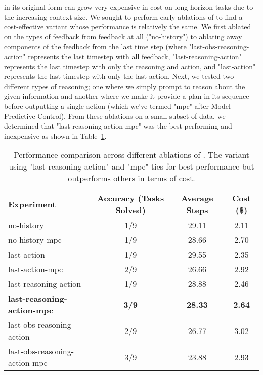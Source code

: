 \react{} in its original form can grow very expensive in cost on long horizon tasks due to the increasing context size. We sought to perform early ablations of \react{} to find a cost-effective variant whose performance is relatively the same. We first ablated on the types of feedback from feedback at all ("no-history") to ablating away components of the feedback from the last time step (where "last-obs-reasoning-action" represents the last timestep with all feedback, "last-reasoning-action" represents the last timestep with only the reasoning and action, and "last-action" represents the last timestep with only the last action. Next, we tested two different types of reasoning; one where we simply prompt \react{} to reason about the given information and another where we make it provide a plan in its sequence before outputting a single action (which we've termed "mpc" after Model Predictive Control). From these ablations on a small subset of data, we determined that "last-reasoning-action-mpc" was the best performing and inexpensive as shown in Table~\ref{tab:ablation1}.

\begin{table}[ht]
\centering
\begin{tabular}{lccc}
\toprule
\textbf{Experiment}                    & \textbf{Accuracy (Tasks Solved)} & \textbf{Average Steps} & \textbf{Cost (\$)} \\ 
\midrule
no-history                             & 1/9                              & 29.11                  & 2.11               \\ 
no-history-mpc                         & 1/9                              & 28.66                  & 2.70               \\ 
last-action                            & 1/9                              & 29.55                  & 2.35               \\ 
last-action-mpc                        & 2/9                              & 26.66                  & 2.92               \\ 
last-reasoning-action                  & 1/9                              & 28.88                  & 2.46               \\ 
\textbf{last-reasoning-action-mpc}     & \textbf{3/9}                     & \textbf{28.33}         & \textbf{2.64}      \\ 
last-obs-reasoning-action              & 2/9                              & 26.77                  & 3.02               \\ 
last-obs-reasoning-action-mpc          & 3/9                              & 23.88                  & 2.93               \\ 
\bottomrule
\end{tabular}
\caption{Performance comparison across different ablations of \react{}. The variant using "last-reasoning-action" and "mpc" ties for best performance but outperforms others in terms of cost.}
\label{tab:ablation1}
\end{table}



